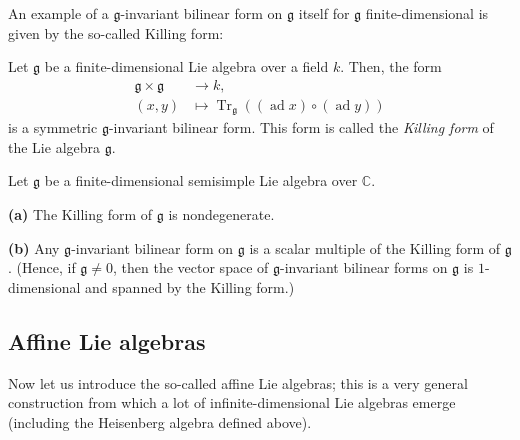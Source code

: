 \documentclass[etingof-lie.tex]{subfiles}
\begin{document}
An example of a $\mathfrak{g}$-invariant bilinear form on $\mathfrak{g}$
itself for $\mathfrak{g}$ finite-dimensional is given by the so-called Killing form:

\begin{proposition}
\label{prop.killing}Let $\mathfrak{g}$ be a finite-dimensional Lie algebra
over a field $k$. Then, the form%
\begin{align*}
\mathfrak{g}\times\mathfrak{g}  &  \rightarrow k,\\
\left(  x,y\right)   &  \mapsto\operatorname*{Tr}\nolimits_{\mathfrak{g}%
}\left(  \left(  \operatorname*{ad}x\right)  \circ\left(  \operatorname*{ad}%
y\right)  \right)
\end{align*}
is a symmetric $\mathfrak{g}$-invariant bilinear form. This form is called the
\textit{Killing form} of the Lie algebra $\mathfrak{g}$.
\end{proposition}

\begin{proposition}
\label{prop.killing.simple}Let $\mathfrak{g}$ be a finite-dimensional
semisimple Lie algebra over $\mathbb{C}$.

\textbf{(a)} The Killing form of $\mathfrak{g}$ is nondegenerate.

\textbf{(b)} Any $\mathfrak{g}$-invariant bilinear form on $\mathfrak{g}$ is a
scalar multiple of the Killing form of $\mathfrak{g}$. (Hence, if
$\mathfrak{g}\neq0$, then the vector space of $\mathfrak{g}$-invariant
bilinear forms on $\mathfrak{g}$ is $1$-dimensional and spanned by the Killing form.)
\end{proposition}

\subsection{Affine Lie algebras}

Now let us introduce the so-called affine Lie algebras; this is a very general
construction from which a lot of infinite-dimensional Lie algebras emerge
(including the Heisenberg algebra defined above).
\end{document}
